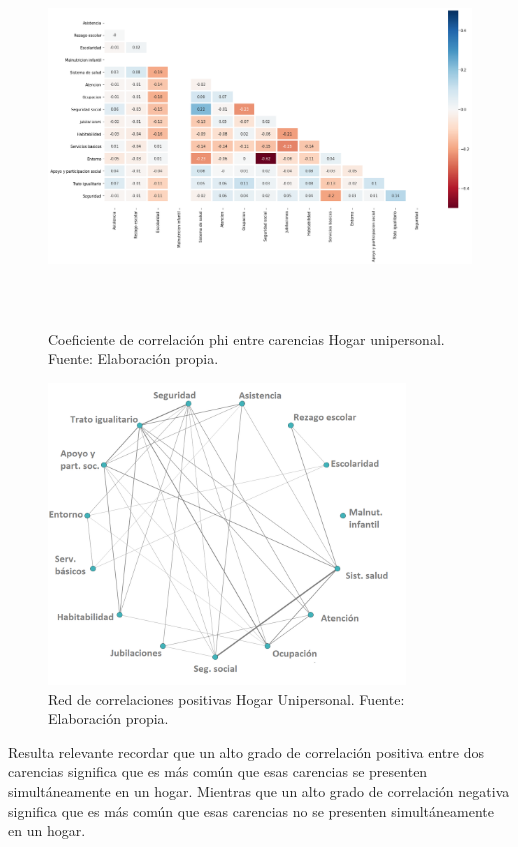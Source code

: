 \documentclass[12pt,letterpaper,spanish]{article}
\begin{document}
\begin{figure}[H]
    \centering
        \includegraphics[height=10cm]{Heatmaps/Heatmap_pearson_car_unip.png}
    \caption{Coeficiente de correlación phi entre carencias Hogar unipersonal. Fuente: Elaboración propia.}
    \label{HMUni}
\end{figure}
\begin{figure}[H]
  \centering
    \includegraphics[height=8cm]{Grafos/grafo_unipersonal_pos.png}
    \caption{Red de correlaciones positivas Hogar Unipersonal. Fuente: Elaboración propia.}
    \label{RedUnipos}
\end{figure}
Resulta relevante recordar que un alto grado de correlación positiva entre dos carencias significa que es más común que esas carencias se presenten simultáneamente en un hogar. Mientras que un alto grado de correlación negativa significa que es más común que esas carencias no se presenten simultáneamente en un hogar.  
\end{document}
